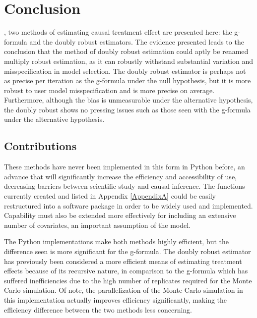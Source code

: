 \chapter{Conclusion}
\label{conclusion}


, two methods of estimating causal treatment effect are presented here: the g-formula and the doubly robust estimators.  The evidence presented leads to the conclusion that the method of doubly robust estimation could aptly be renamed multiply robust estimation, as it can robustly withstand substantial variation and misspecification in model selection.  The doubly robust estimator is perhaps not as precise per iteration as the g-formula under the null hypothesis, but it is more robust to user model misspecification and is more precise on average.  Furthermore, although the bias is unmeasurable under the alternative hypothesis, the doubly robust shows no pressing issues such as those seen with the g-formula under the alternative hypothesis.  

\section{Contributions}
These methods have never been implemented in this form in Python before, an advance that will significantly increase the efficiency and accessibility of use, decreasing barriers between scientific study and causal inference.  The functions currently created and listed in Appendix \ref{AppendixA} could be easily restructured into a software package in order to be widely used and implemented.  Capability must also be extended more effectively for including an extensive number of covariates, an important assumption of the model.  

The Python implementations make both methods highly efficient, but the difference seen is more significant for the g-formula.  The doubly robust estimator has previously been considered a more efficient means of estimating treatment effects because of its recursive nature, in comparison to the g-formula which has suffered inefficiencies due to the high number of replicates required for the Monte Carlo simulation.  Of note, the parallelization of the Monte Carlo simulation in this implementation actually improves efficiency significantly, making the efficiency difference between the two methods less concerning.  


